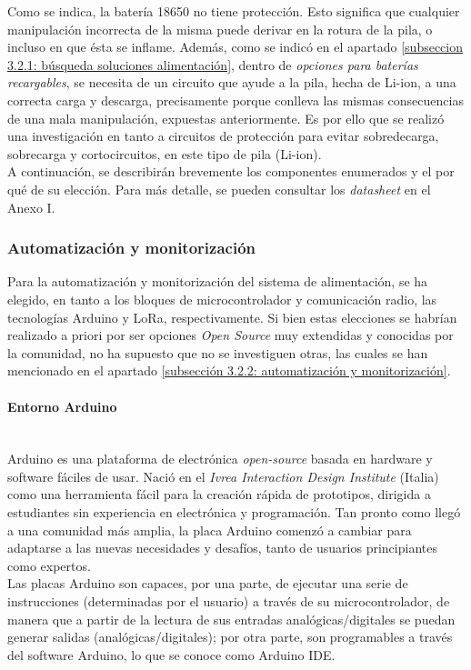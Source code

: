 \documentclass[12pt]{article}
\newcommand{\subsubsubsection}[1]{\paragraph{#1}\mbox{}\\}
\begin{document}
	\noindent Como se indica, la batería 18650 no tiene protección. Esto significa que cualquier manipulación incorrecta de la misma puede derivar en la rotura de la pila, o incluso en que ésta se inflame.  Además, como se indicó en el apartado \ref{subseccion 3.2.1: búsqueda soluciones alimentación}, dentro de \textit{opciones para baterías recargables}, se necesita de un circuito que ayude a la pila, hecha de Li-ion, a una correcta carga y descarga, precisamente porque conlleva las mismas consecuencias de una mala manipulación, expuestas anteriormente. Es por ello que se realizó una investigación en tanto a circuitos de protección para evitar sobredecarga, sobrecarga y cortocircuitos, en este tipo de pila (Li-ion). \\
	
	\noindent A continuación, se describirán brevemente los componentes enumerados y el por qué de su elección. Para más detalle, se pueden consultar los \textit{datasheet} en el Anexo I.
	
	\subsubsection{Automatización y monitorización}
	
	\noindent Para la automatización y monitorización del sistema de alimentación, se ha elegido, en tanto a los bloques de microcontrolador y  comunicación radio, las tecnologías Arduino y LoRa, respectivamente. Si bien estas elecciones se habrían realizado a priori por ser opciones \textit{Open Source} muy extendidas y conocidas por la comunidad, no ha supuesto que no se investiguen otras, las cuales se han mencionado en el apartado \ref{subsección 3.2.2: automatización y monitorización}.
	
	\subsubsubsection{Entorno Arduino}
	
	
	\noindent Arduino es una plataforma de electrónica \textit{open-source} basada en hardware y software fáciles de usar. Nació en el \textit{Ivrea Interaction Design Institute} (Italia) como una herramienta fácil para la creación rápida de prototipos, dirigida a estudiantes sin experiencia en electrónica y programación. Tan pronto como llegó a una comunidad más amplia, la placa Arduino comenzó a cambiar para adaptarse a las nuevas necesidades y desafíos, tanto de usuarios principiantes como expertos. \\
	
	\noindent Las placas Arduino son capaces, por una parte, de ejecutar una serie de instrucciones (determinadas por el usuario) a través de su microcontrolador, de manera que a partir de la lectura de sus entradas analógicas/digitales se puedan generar salidas (analógicas/digitales); por otra parte, son programables a través del software Arduino, lo que se conoce como Arduino IDE. \\
	
\end{document}
